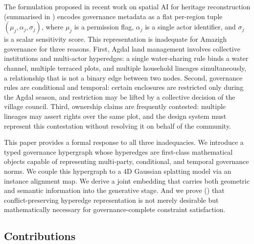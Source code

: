 \documentclass[11pt,a4paper]{article}
\theoremstyle{plain}
\theoremstyle{definition}
\theoremstyle{remark}
\begin{document}
The formulation proposed in recent work on spatial AI for heritage
reconstruction (summarised in ) encodes
governance metadata as a flat per-region tuple
$(\mu_j, \alpha_j, \sigma_j)$, where $\mu_j$ is a permission flag,
$\alpha_j$ is a single actor identifier, and $\sigma_j$ is a scalar
sensitivity score. This representation is inadequate for Amazigh
governance for three reasons. First, Agdal land management involves
collective institutions and multi-actor hyperedges: a single water-sharing
rule binds a water channel, multiple terraced plots, and multiple
household lineages simultaneously, a relationship that is not a binary
edge between two nodes. Second, governance rules are conditional and
temporal: certain enclosures are restricted only during the Agdal season,
and restriction may be lifted by a collective decision of the village
council. Third, ownership claims are frequently contested: multiple
lineages may assert rights over the same plot, and the design system must
represent this contestation without resolving it on behalf of the community.

This paper provides a formal response to all three inadequacies. We
introduce a typed governance hypergraph whose hyperedges are first-class
mathematical objects capable of representing multi-party, conditional,
and temporal governance norms. We couple this hypergraph to a 4D Gaussian
splatting model via an instance alignment map. We derive a joint embedding
that carries both geometric and semantic information into the generative
stage. And we prove () that
conflict-preserving hyperedge representation is not merely desirable but
mathematically necessary for governance-complete constraint satisfaction.

\subsection{Contributions}
\label{sec:contributions}
\end{document}
